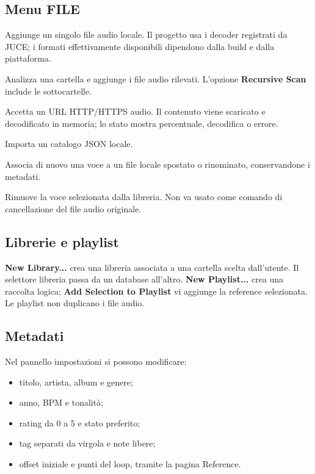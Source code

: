 \documentclass[11pt,a4paper]{article}
\newcommand{\control}[1]{\textbf{\textsf{#1}}}
\newcommand{\menuitem}[1]{\textsf{#1}}
\begin{document}
\subsection{Menu FILE}

\begin{description}[style=nextline]
  \item[\menuitem{Add Audio File...}] Aggiunge un singolo file audio locale.
  Il progetto usa i decoder registrati da JUCE; i formati effettivamente
  disponibili dipendono dalla build e dalla piattaforma.
  \item[\menuitem{Scan Folder...}] Analizza una cartella e aggiunge i file
  audio rilevati. L'opzione \control{Recursive Scan} include le sottocartelle.
  \item[\menuitem{Add Web Source...}] Accetta un URL HTTP/HTTPS audio. Il
  contenuto viene scaricato e decodificato in memoria; lo stato mostra
  percentuale, decodifica o errore.
  \item[\menuitem{Import JSON Catalog...}] Importa un catalogo JSON locale.
  \item[\menuitem{Relink Reference...}] Associa di nuovo una voce a un file
  locale spostato o rinominato, conservandone i metadati.
  \item[\menuitem{Remove Reference}] Rimuove la voce selezionata dalla libreria.
  Non va usato come comando di cancellazione del file audio originale.
\end{description}

\subsection{Librerie e playlist}

\control{New Library...} crea una libreria associata a una cartella scelta
dall'utente. Il selettore libreria passa da un database all'altro.
\control{New Playlist...} crea una raccolta logica; \control{Add Selection to
Playlist} vi aggiunge la reference selezionata. Le playlist non duplicano i
file audio.

\subsection{Metadati}

Nel pannello impostazioni si possono modificare:

\begin{itemize}
  \item titolo, artista, album e genere;
  \item anno, BPM e tonalità;
  \item rating da 0 a 5 e stato preferito;
  \item tag separati da virgola e note libere;
  \item offset iniziale e punti del loop, tramite la pagina Reference.
\end{itemize}
\end{document}
